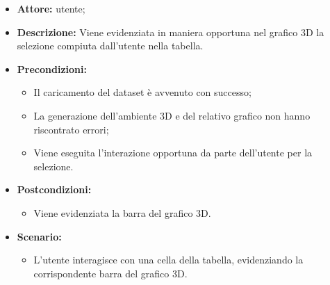 \begin{itemize}    
    \item \textbf{Attore:} utente;
    \item \textbf{Descrizione:} Viene evidenziata in maniera opportuna nel grafico 3D la selezione compiuta dall'utente nella tabella.
    \item \textbf{Precondizioni:}    
        \begin{itemize}
            \item Il caricamento del dataset è avvenuto con successo;
            \item La generazione dell'ambiente 3D e del relativo grafico non hanno riscontrato errori;
            \item Viene eseguita l'interazione opportuna da parte dell'utente per la selezione.
        \end{itemize}    
    \item \textbf{Postcondizioni:}
        \begin{itemize}
            \item Viene evidenziata la barra del grafico 3D.
        \end{itemize}    
    \item \textbf{Scenario:} 
        \begin{itemize}
            \item L'utente interagisce con una cella della tabella, evidenziando la corrispondente barra del grafico 3D.
        \end{itemize}
\end{itemize}
